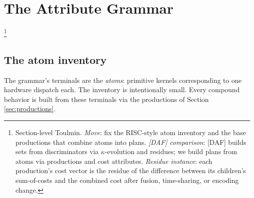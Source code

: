 \section{The Attribute Grammar}\label{sec:grammar}\footnote{Section-level Toulmin. \emph{Move}: fix the RISC-style atom inventory and the base productions that combine atoms into plans. \emph{[DAF] comparison}: [DAF] builds sets from discriminators via $\kappa$-evolution and residues; we build plans from atoms via productions and cost attributes. \emph{Residue instance}: each production's cost vector is the residue of the difference between its children's sum-of-costs and the combined cost after fusion, time-sharing, or encoding change.}

\subsection{The atom inventory}\label{sec:atoms}

The grammar's terminals are the \emph{atoms}: primitive
kernels corresponding to one hardware dispatch each. The
inventory is intentionally small. Every compound behavior
is built from these terminals via the productions of
Section \ref{sec:productions}.


